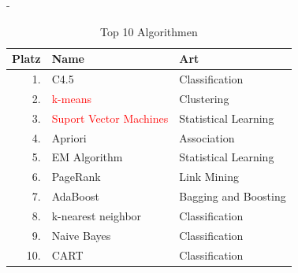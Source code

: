 \documentclass[fleqn,11pt,aspectratio=43]{beamer}
\begin{document}
\begin{frame}{\insertsectionhead - \insertsubsectionhead \cite{wu2008top}}

\begin{table}
\centering
\begin{tabular}{r|l|l}
Platz & Name & Art\\ \hline
1.& C4.5 & Classification\\
2.& \textcolor{red}{k-means} & Clustering\\
3.& \textcolor{red}{Suport Vector Machines} & Statistical Learning\\
4.& Apriori & Association\\
5.& EM Algorithm & Statistical Learning\\
6.& PageRank & Link Mining\\
7.& AdaBoost & Bagging and Boosting\\
8.& k-nearest neighbor & Classification\\
9.& Naive Bayes & Classification\\
10.& CART & Classification
\end{tabular}
\label{top10}
\caption{Top 10 Algorithmen \cite{wu2008top}}
\end{table}


\end{frame}
\end{document}
